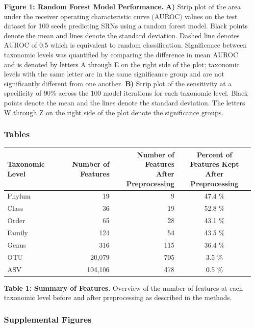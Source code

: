 \documentclass[
]{article}
\begin{document}
\textbf{Figure 1: Random Forest Model Performance.} \textbf{A)} Strip
plot of the area under the receiver operating characteristic curve
(AUROC) values on the test dataset for 100 seeds predicting SRNs using a
random forest model. Black points denote the mean and lines denote the
standard deviation. Dashed line denotes AUROC of 0.5 which is equivalent
to random classification. Significance between taxonomic levels was
quantified by comparing the difference in mean AUROC and is denoted by
letters A through E on the right side of the plot; taxonomic levels with
the same letter are in the same significance group and are not
significantly different from one another. \textbf{B)} Strip plot of the
sensitivity at a specificity of 90\% across the 100 model iterations for
each taxonomic level. Black points denote the mean and the lines denote
the standard deviation. The letters W through Z on the right side of the
plot denote the significance groups.

\newpage

\hypertarget{tables}{%
\subsubsection{Tables}\label{tables}}

\begin{longtable}[]{@{}lrrc@{}}
\toprule
Taxonomic Level & Number of Features &
\makecell[c]{Number of Features \\ After Preprocessing} &
\makecell[c]{Percent of Features Kept \\ After Preprocessing} \\
\midrule
\endhead
Phylum & 19 & 9 & 47.4 \% \\
Class & 36 & 19 & 52.8 \% \\
Order & 65 & 28 & 43.1 \% \\
Family & 124 & 54 & 43.5 \% \\
Genus & 316 & 115 & 36.4 \% \\
OTU & 20,079 & 705 & 3.5 \% \\
ASV & 104,106 & 478 & 0.5 \% \\
\bottomrule
\end{longtable}

\textbf{Table 1: Summary of Features.} Overview of the number of
features at each taxonomic level before and after preprocessing as
described in the methods.

\newpage

\hypertarget{supplemental-figures}{%
\subsubsection{Supplemental Figures}\label{supplemental-figures}}
\end{document}
